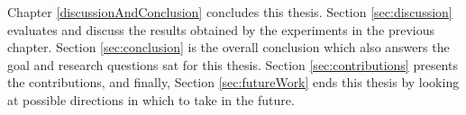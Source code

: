 Chapter \ref{discussionAndConclusion} concludes this thesis. Section \ref{sec:discussion} evaluates and discuss the results obtained by the experiments in the previous chapter. Section \ref{sec:conclusion} is the overall conclusion which also answers the goal and research questions sat for this thesis. Section \ref{sec:contributions} presents the contributions, and finally, Section \ref{sec:futureWork} ends this thesis by looking at possible directions in which to take in the future. 

